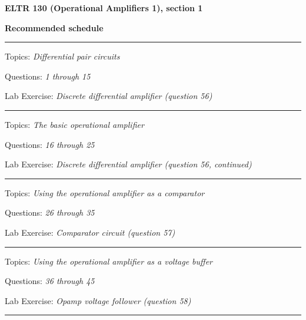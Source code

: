 
\centerline{\bf ELTR 130 (Operational Amplifiers 1), section 1} \bigskip 
 
\vskip 10pt

\noindent
{\bf Recommended schedule}

\vskip 5pt

\hrule \vskip 5pt
\noindent
{}

\hskip 10pt Topics: {\it Differential pair circuits}
 
\hskip 10pt Questions: {\it 1 through 15}
 
\hskip 10pt Lab Exercise: {\it Discrete differential amplifier (question 56)}
 


\vskip 10pt
\hrule \vskip 5pt
\noindent
{}

\hskip 10pt Topics: {\it The basic operational amplifier}
 
\hskip 10pt Questions: {\it 16 through 25}
 
\hskip 10pt Lab Exercise: {\it Discrete differential amplifier (question 56, continued)}
 
\vskip 10pt
\hrule \vskip 5pt
\noindent
{}

\hskip 10pt Topics: {\it Using the operational amplifier as a comparator}
 
\hskip 10pt Questions: {\it 26 through 35}
 
\hskip 10pt Lab Exercise: {\it Comparator circuit (question 57)}
 

\vskip 10pt
\hrule \vskip 5pt
\noindent
{}

\hskip 10pt Topics: {\it Using the operational amplifier as a voltage buffer}
 
\hskip 10pt Questions: {\it 36 through 45}
 
\hskip 10pt Lab Exercise: {\it Opamp voltage follower (question 58)}
 

\vskip 10pt
\hrule \vskip 5pt
\noindent
{}

